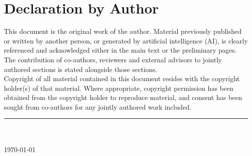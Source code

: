 
\chapter*{Declaration by Author}

\noindent
This document is the original work of the author. Material previously
published or written by another person, or generated by artificial
intelligence (AI), is clearly referenced and acknowledged either in the
main text or the preliminary pages. The contribution of co-authors,
reviewers and external advisors to jointly authored sections is stated
alongside those sections.\\

\noindent
Copyright of all material contained in this document resides with the
copyright holder(s) of that material. Where appropriate, copyright
permission has been obtained from the copyright holder to reproduce
material, and consent has been sought from co-authors for any jointly
authored work included.\\

\vspace{2em}
\noindent\rule{6cm}{0.4pt}\\
\theauthor\\
\today
